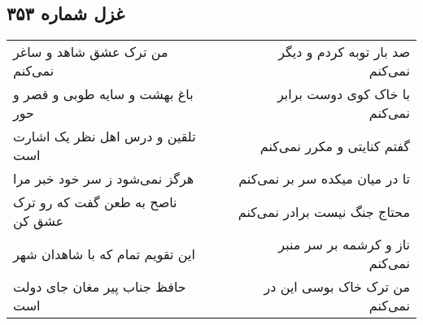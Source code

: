 \begin{center}
\section*{غزل شماره ۳۵۳}
\label{sec:sh353}
\begin{longtable}{l p{0.5cm} r}
من ترک عشق شاهد و ساغر نمی‌کنم
&&
صد بار توبه کردم و دیگر نمی‌کنم
\\
باغ بهشت و سایه طوبی و قصر و حور
&&
با خاک کوی دوست برابر نمی‌کنم
\\
تلقین و درس اهل نظر یک اشارت است
&&
گفتم کنایتی و مکرر نمی‌کنم
\\
هرگز نمی‌شود ز سر خود خبر مرا
&&
تا در میان میکده سر بر نمی‌کنم
\\
ناصح به طعن گفت که رو ترک عشق کن
&&
محتاج جنگ نیست برادر نمی‌کنم
\\
این تقویم تمام که با شاهدان شهر
&&
ناز و کرشمه بر سر منبر نمی‌کنم
\\
حافظ جناب پیر مغان جای دولت است
&&
من ترک خاک بوسی این در نمی‌کنم
\\
\end{longtable}
\end{center}
